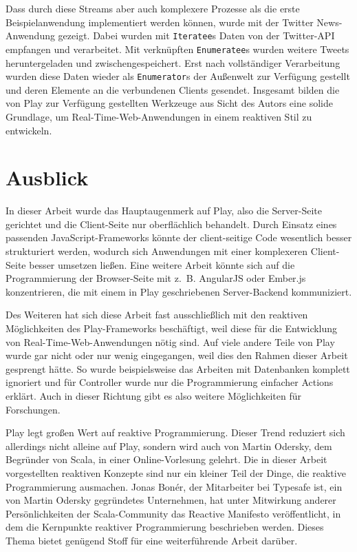 Dass durch diese Streams aber auch komplexere Prozesse als die erste Beispielanwendung implementiert werden können, wurde mit der Twitter News-Anwendung gezeigt.
Dabei wurden mit \lstinline|Iteratee|s Daten von der Twitter-API empfangen und verarbeitet.
Mit verknüpften \lstinline|Enumeratee|s wurden weitere Tweets heruntergeladen und zwischengespeichert.
Erst nach vollständiger Verarbeitung wurden diese Daten wieder als \lstinline|Enumerator|s der Außenwelt zur Verfügung gestellt und deren Elemente an die verbundenen Clients gesendet.
Insgesamt bilden die von Play zur Verfügung gestellten Werkzeuge aus Sicht des Autors eine solide Grundlage, um Real-Time-Web-Anwendungen in einem reaktiven Stil zu entwickeln.


\section{Ausblick} %
\label{sec:ausblick}

In dieser Arbeit wurde das Hauptaugenmerk auf Play, also die Server-Seite gerichtet und die Client-Seite nur oberflächlich behandelt.
Durch Einsatz eines passenden JavaScript-Frameworks könnte der client-seitige Code wesentlich besser strukturiert werden, wodurch sich Anwendungen mit einer komplexeren Client-Seite besser umsetzen ließen.
Eine weitere Arbeit könnte sich auf die Programmierung der Browser-Seite mit z.~B. AngularJS \cite[vgl.][]{angular_js} oder \mbox{Ember.js} \cite[vgl.][]{ember_js} konzentrieren, die mit einem in Play geschriebenen Server-Backend kommuniziert. %

Des Weiteren hat sich diese Arbeit fast ausschließlich mit den reaktiven Möglichkeiten des Play-Frameworks beschäftigt, weil diese für die Entwicklung von Real-Time-Web-Anwendungen nötig sind.
Auf viele andere Teile von Play wurde gar nicht oder nur wenig eingegangen, weil dies den Rahmen dieser Arbeit gesprengt hätte.
So wurde beispielsweise das Arbeiten mit Datenbanken komplett ignoriert und für Controller wurde nur die Programmierung einfacher Actions erklärt.
Auch in dieser Richtung gibt es also weitere Möglichkeiten für Forschungen.

Play legt großen Wert auf reaktive Programmierung.
Dieser Trend reduziert sich allerdings nicht alleine auf Play, sondern wird auch von Martin Odersky, dem Begründer von Scala, in einer Online-Vorlesung \cite[vgl.][]{principles_of_reactive_programming} gelehrt.
Die in dieser Arbeit vorgestellten reaktiven Konzepte sind nur ein kleiner Teil der Dinge, die reaktive Programmierung ausmachen.
Jonas Bonér, der Mitarbeiter bei Typesafe ist, ein von Martin Odersky gegründetes Unternehmen, hat unter Mitwirkung anderer Persönlichkeiten der Scala-Community das Reactive Manifesto \cite[vgl.][]{reactive_manifesto} veröffentlicht, in dem die Kernpunkte reaktiver Programmierung beschrieben werden.
Dieses Thema bietet genügend Stoff für eine weiterführende Arbeit darüber.


